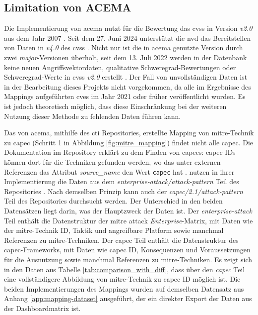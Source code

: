 \subsection{Limitation von ACEMA}
\label{limitationen-acema}
Die Implementierung von \gls{acema} nutzt für die Bewertung das \gls{cvss} in Version \textit{v2.0} aus dem Jahr 2007 \autocite[Zeile 75 - 80]{Acema_oranOCloud_Data_GatheringpyMaster}. Seit dem 27. Juni 2024 unterstützt die \gls{nvd} das Bereitstellen von Daten in \textit{v4.0} des \gls{cvss} \autocite{NVDCVSSV40}. Nicht nur ist die in \gls{acema} genutzte Version durch zwei \textit{major}-Versionen überholt, seit dem 13. Juli 2022 werden in der Datenbank keine neuen Angriffsvektordaten, qualitative Schweregrad-Bewertungen oder Schweregrad-Werte in \gls{cvss} \textit{v2.0} erstellt \autocite{RetirementCVSSV2}. Der Fall von unvollständigen Daten ist in der Bearbeitung dieses Projekts nicht vorgekommen, da alle im Ergebnisse des Mappings aufgeführten \glspl{cve} im Jahr 2021 oder früher veröffentlicht wurden. Es ist jedoch theoretisch möglich, dass diese Einschränkung bei der weiteren Nutzung dieser Methode zu fehlenden Daten führen kann.
%
\par Das von \gls{acema}, mithilfe des \gls{cti} Repositories, erstellte Mapping von \gls{mitre}-Technik zu \gls{capec} (Schritt 1 in Abbildung \ref{fig:mitre_mapping}) findet nicht alle \gls{capec}. Die Dokumentation im Repository erklärt zu dem Finden von \glspl{capec}: \gls{capec} IDs können dort für die Techniken gefunden werden, wo das unter externen Referenzen das Attribut \textit{source\_name} den Wert \verb|capec| hat \autocite{CtiUSAGEmdMaster} \autocite{CtiUSAGECAPECmdMaster}. \citeauthor{klementSecuring6GTransition2024} nutzen in ihrer Implementierung die Daten aus dem \textit{enterprise-attack/attack-pattern} Teil des Repositories \autocite{FklementAcema_oranCode}. Nach demselben Prinzip kann auch der \textit{capec/2.1/attack-pattern} Teil des Repositories durchsucht werden. Der Unterschied in den beiden Datensätzen liegt darin, was der Hauptzweck der Daten ist. Der \textit{enterprise-attack} Teil enthält die Datenstruktur  der \gls{mitre} \gls{attack} \textit{Enterprise}-Matrix, mit Daten wie der \gls{mitre}-Technik ID, Taktik und angreifbare Platform sowie manchmal Referenzen zu \gls{mitre}-Techniken. Der \gls{capec} Teil enthält die Datenstruktur  des \gls{capec}-Frameworks, mit Daten wie \gls{capec} ID, Konsequenzen und Voraussetzungen für die Ausnutzung sowie manchmal Referenzen zu \gls{mitre}-Techniken. Es zeigt sich in den Daten aus Tabelle \ref{tab:comparison_with_diff}, dass über den \textit{\gls{capec}} Teil eine vollständigere Abbildung von \gls{mitre}-Technik zu \gls{capec} ID möglich ist. Die beiden Implementierungen des Mappings wurden auf demselben Datensatz aus Anhang \ref{app:mapping-dataset} ausgeführt, der ein direkter Export der Daten aus der Dashboardmatrix ist.
%

